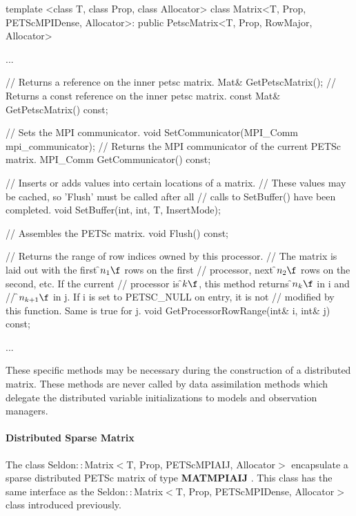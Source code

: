 \documentclass{tufte-book}
\begin{document}
\begin{frame_cpp}
template <class T, class Prop, class Allocator>
class Matrix<T, Prop, PETScMPIDense, Allocator>:
public PetscMatrix<T, Prop, RowMajor, Allocator>
{
	...

    // Returns a reference on the inner petsc matrix.
    Mat& GetPetscMatrix();
    // Returns a const reference on the inner petsc matrix.
    const Mat& GetPetscMatrix() const;


    // Sets the MPI communicator.
    void SetCommunicator(MPI_Comm mpi_communicator);
    // Returns the MPI communicator of the current PETSc matrix.
    MPI_Comm GetCommunicator() const;

    // Inserts or adds values into certain locations of a matrix.
    // \warning These values may be cached, so 'Flush' must be called after all
    // calls to SetBuffer() have been completed.
    void SetBuffer(int, int, T, InsertMode);

    // Assembles the PETSc matrix.
    void Flush() const;

    // Returns the range of row indices owned by this processor.
    // The matrix is laid out with the first \f$n_1\f$ rows on the first
    // processor, next \f$n_2\f$ rows on the second, etc. If the current
    // processor is \f$k\f$, this method returns \f$n_k\f$ in \a i and
    // \f$n_{k+1}\f$ in \a j. If \a i is set to PETSC_NULL on entry, it is not
    // modified by this function. Same is true for \a j.
    void GetProcessorRowRange(int& i, int& j) const;

    ...
}
\end{frame_cpp}


\par These specific methods may be necessary during the construction of a distributed matrix. These methods are never called by data assimilation methods which delegate the distributed variable initializations to models and observation managers.

\hypertarget{seq-par-ds-smatrix}{}\paragraph{Distributed Sparse Matrix}\label{seq-par-ds-smatrix}

The class Seldon$::$Matrix$<$T, Prop, PETScMPIAIJ, Allocator$>$  encapsulate a sparse distributed PETSc matrix of type \textbf{MATMPIAIJ} . This class has the same interface as the  Seldon$::$Matrix$<$T, Prop, PETScMPIDense, Allocator$>$ class  introduced previously.
\end{document}
